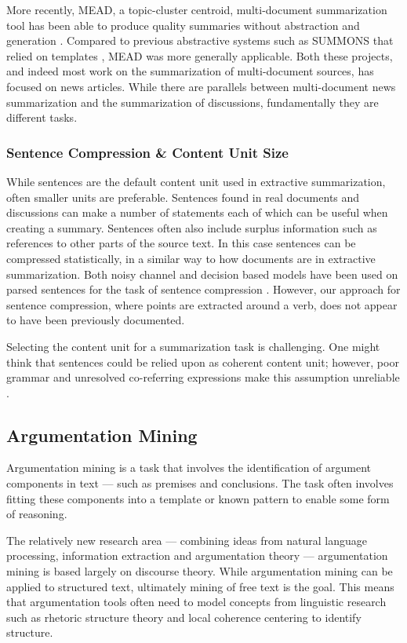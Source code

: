         More recently, MEAD, a topic-cluster centroid, multi-document summarization tool has been able to produce quality summaries without abstraction and generation \cite{radev2000centroid}. Compared to previous abstractive systems such as SUMMONS that relied on templates \cite{mckeown1995generating}, MEAD was more generally applicable. Both these projects, and indeed most work on the summarization of multi-document sources, has focused on news articles. While there are parallels between multi-document news summarization and the summarization of discussions, fundamentally they are different tasks.

      \tocless\subsubsection{Sentence Compression \& Content Unit Size}

        While sentences are the default content unit used in extractive summarization, often smaller units are preferable. Sentences found in real documents and discussions can make a number of statements each of which can be useful when creating a summary. Sentences often also include surplus information such as references to other parts of the source text. In this case sentences can be compressed statistically, in a similar way to how documents are in extractive summarization. Both noisy channel and decision based models have been used on parsed sentences for the task of sentence compression \cite{knight2000statistics}. However, our approach for sentence compression, where points are extracted around a verb, does not appear to have been previously documented.

        Selecting the content unit for a summarization task is challenging. One might think that sentences could be relied upon as coherent content unit; however, poor grammar and unresolved co-referring expressions make this assumption unreliable \cite{witbrock1999ultra}.

    \tocless\subsection{Argumentation Mining}
      Argumentation mining is a task that involves the identification of argument components in text --- such as premises and conclusions. The task often involves fitting these components into a template or known pattern to enable some form of reasoning. \cite{palau2009argumentation}

      The relatively new research area  --- combining ideas from natural language processing, information extraction and argumentation theory --- argumentation mining is based largely on discourse theory. While argumentation mining can be applied to structured text, ultimately mining of free text is the goal. This means that argumentation tools often need to model concepts from linguistic research such as rhetoric structure theory \cite{mann1988rhetorical} and local coherence centering \cite{weinstein21centering} to identify structure.


